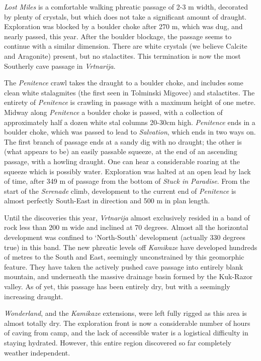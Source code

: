 \emph{Lost Miles}  is a comfortable
walking phreatic passage of 2-3 m width, decorated by plenty of
crystals, but which does not take a significant amount of draught.
Exploration was blocked by a boulder choke after 270 m, which was dug,
and nearly passed, this year. After the boulder blockage, the passage
seems to continue with a similar dimension. There are white crystals (we
believe Calcite and Aragonite) present, but no stalactites. This
termination is now the most Southerly cave passage in \emph{Vrtnarija}.

The \emph{Penitence} crawl  takes the
draught to a boulder choke, and includes some clean white stalagmites
(the first seen in Tolminski Migovec) and stalactites. The entirety of
\emph{Penitence} is crawling in passage with a maximum height of one
metre. Midway along \emph{Penitence} a boulder choke is passed, with a
collection of approximately half a dozen white stal columns 20-30cm
high. \emph{Penitence} ends in a boulder choke, which was passed to lead
to \emph{Salvation}, which ends in two ways on. The first branch of
passage ends at a sandy dig with no draught; the other is (what appears
to be) an easily passable squeeze, at the end of an ascending passage,
with a howling draught. One can hear a considerable roaring at the
squeeze which is possibly water. Exploration was halted at an open lead
by lack of time, after 349 m of passage from the bottom of \emph{Stuck
in Paradise}. From the start of the \emph{Serenade} climb, development
to the current end of \emph{Penitence} is almost perfectly South-East in
direction and 500 m in plan length.

Until the discoveries this year, \emph{Vrtnarija} almost exclusively
resided in a band of rock less than 200 m wide and inclined at 70
degrees. Almost all the horizontal development was confined to
`North-South' development (actually 330 degrees true) in this band. The
new phreatic levels off \emph{Kamikaze} have developed hundreds of
metres to the South and East, seemingly unconstrained by this geomorphic
feature. They have taken the actively pushed cave passage into entirely
blank mountain, and underneath the massive drainage basin formed by the
Kuk-Razor valley. As of yet, this passage has been entirely dry, but
with a seemingly increasing draught.

\emph{Wonderland}, and the \emph{Kamikaze} extensions, were left fully
rigged as this area is almost totally dry. The exploration front is now
a considerable number of hours of caving from camp, and the lack of
accessible water is a logistical difficulty in staying hydrated.
However, this entire region discovered so far completely weather
independent.

